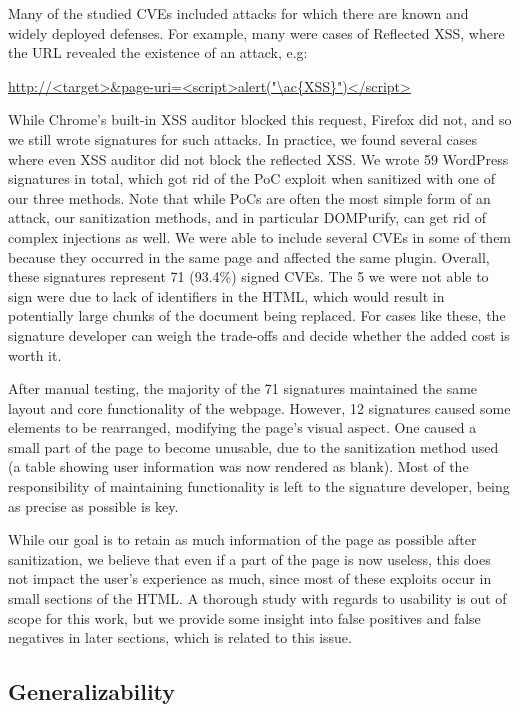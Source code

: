 Many of the studied CVEs included attacks for which there are known and widely deployed defenses. For example, many were cases of Reflected \ac{XSS}, where the URL revealed the existence of an attack, e.g:


\url{http://<target>&page-uri=<script>alert("\ac{XSS}")</script>}

While Chrome's built-in \ac{XSS} auditor blocked this request, Firefox did not, and so we still wrote signatures for such attacks. In practice, we found several cases where even XSS auditor did not block the reflected XSS. We wrote 59 WordPress signatures in total, which got rid of the PoC exploit when sanitized with one of our three methods. Note that while PoCs are often the most simple form of an attack, our sanitization methods, and in particular DOMPurify, can get rid of complex injections as well. We were able to include several CVEs in some of them because they occurred in the same page and affected the same plugin. Overall, these signatures represent 71 (93.4\%) signed CVEs. The 5 we were not able to sign were due to lack of identifiers in the HTML, which would result in potentially large chunks of the document being replaced. For cases like these, the signature developer can weigh the trade-offs and decide whether the added cost is worth it.

After manual testing, the majority of the 71 signatures maintained the same layout and core functionality of the webpage. However, 12 signatures caused some elements to be rearranged, modifying the page's visual aspect. One caused a small part of the page to become unusable, due to the sanitization method used (a table showing user information was now rendered as blank). Most of the responsibility of maintaining functionality is left to the signature developer, being as precise as possible is key.

While our goal is to retain as much information of the page as possible after sanitization, we believe that even if a part of the page is now useless, this does not impact the user's experience as much, since most of these exploits occur in small sections of the HTML. A thorough study with regards to usability is out of scope for this work, but we provide some insight into false positives and false negatives in later sections, which is related to this issue.

\subsection{Generalizability} \label{generalizability}

